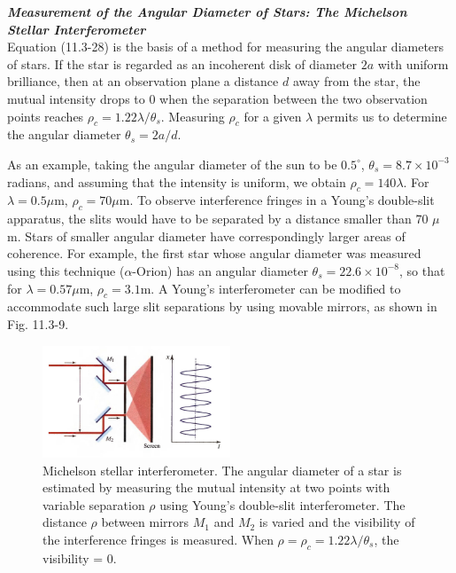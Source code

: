 \documentclass{article}
\newcommand\crule[3][black]{\textcolor{#1}{\rule{#2}{#3}}}
\numberwithin{figure}{subsection}
\numberwithin{table}{subsection}
\newcommand\degree{^\circ}
\begin{document}
\noindent{\crule[ksc]{\textwidth}{0.1cm}}
\bigbreak\noindent\textcolor{ksc}{\textbf{\textsl{Measurement of the Angular Diameter of Stars: The Michelson Stellar Interferometer}}}\\
Equation (11.3-28) is the basis of a method for measuring the angular diameters of stars. If the star is regarded as an incoherent disk of diameter $2a$ with uniform brilliance, then at an observation plane a distance $d$ away from the star, the mutual intensity drops to $0$ when the separation between the two observation points reaches $\rho_c = 1.22 \lambda / \theta_s$. Measuring $\rho_c$ for a given $\lambda$ permits us to determine the angular diameter $\theta_s = 2a / d$.
\par As an example, taking the angular diameter of the sun to be $0.5\degree$, $\theta_s = 8.7 \times 10^{-3}$ radians, and assuming that the intensity is uniform, we obtain $\rho_c = 140\lambda$. For $\lambda = 0.5 \mu$m, $\rho_c = 70 \mu$m. To observe interference fringes in a Young's double-slit apparatus, the slits would have to be separated by a distance smaller than 70 $\mu$m. Stars of smaller angular diameter have correspondingly larger areas of coherence. For example, the first star whose angular diameter was measured using this technique ($\alpha\text{-Orion}$) has an angular diameter $\theta_s = 22.6\times 10^{-8}$, so that for $\lambda = 0.57 \mu$m, $\rho_c = 3.1$m. A Young's interferometer can be modified to accommodate such large slit separations by using movable mirrors, as shown in Fig. 11.3-9.
\begin{figure}[H]
\centering
\includegraphics[width=0.5\textwidth]{11_3_9.PNG}
\caption{Michelson stellar interferometer. The angular diameter of a star is estimated by measuring the mutual intensity at two points with variable separation $\rho$ using Young's double-slit interferometer. The distance $\rho$ between mirrors $M_1$ and $M_2$ is varied and the visibility of the interference fringes is measured. When $\rho = \rho_c = 1.22\lambda / \theta_s$, the visibility = 0.}
\label{fig: 11_3_9}
\end{figure}
\end{document}
